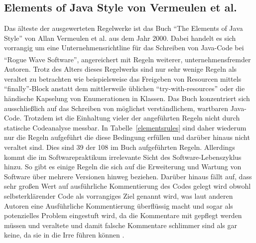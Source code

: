 \documentclass[da,ngerman]{stthesis}
\begin{document}
			\subsection{Elements of Java Style von Vermeulen et al.}
				Das älteste der ausgewerteten Regelwerke ist das Buch "`The Elements of Java Style"' von Allan Vermeulen et al. \cite{ElementsOfJavaStyle} aus dem Jahr 2000. Dabei handelt es sich vorrangig um eine Unternehmensrichtline für das Schreiben von Java-Code bei "`Rogue Wave\textsuperscript{\textregistered} Software"', angereichert mit Regeln weiterer, unternehmensfremder Autoren. Trotz des Alters dieses Regelwerks sind nur sehr wenige Regeln als veraltet zu betrachten wie beispielsweise das Freigeben von Resourcen mittels "`finally"'-Block anstatt dem mittlerweile üblichen "`try-with-resources"' oder die händische Kapselung von Enumerationen in Klassen. \newline
				Das Buch konzentriert sich ausschließlich auf das Schreiben von möglichst verständlichem, wartbaren Java-Code. Trotzdem ist die Einhaltung vieler der angeführten Regeln nicht durch statische Codeanalyse messbar. In Tabelle~\ref{elementsrules} sind daher wiederum nur die Regeln aufgeführt die diese Bedingung erfüllen und darüber hinaus nicht veraltet sind. Dies sind 39 der 108 im Buch aufgeführten Regeln. \newline
				Allerdings kommt die im Softwarepraktikum irrelevante Sicht des Software-Lebenszyklus hinzu. So gibt es einige Regeln die sich auf die Erweiterung und Wartung von Software über mehrere Versionen hinweg beziehen. Darüber hinaus fällt auf, dass sehr großen Wert auf ausführliche Kommentierung des Codes gelegt wird obwohl selbsterklärender Code als vorrangiges Ziel genannt wird, was laut anderen Autoren eine Ausführliche Kommentierung überflüssig macht und sogar als potenzielles Problem eingestuft wird, da die Kommentare mit gepflegt werden müssen und veraltete und damit falsche Kommentare schlimmer sind als gar keine, da sie in die Irre führen können \cite{CleanCode}.
\end{document}

